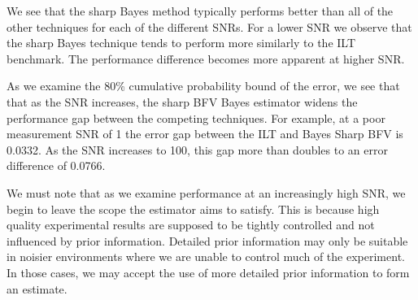 We see that the sharp Bayes method  typically performs better than all of the other techniques for each of the different SNRs. For a lower SNR we observe that the sharp Bayes technique tends to perform more similarly to the ILT benchmark. The performance difference becomes more apparent at higher SNR.

As we examine the 80\% cumulative probability bound of the error, we see that that as the SNR increases, the sharp BFV Bayes estimator widens the performance gap between the competing techniques. For example, at a poor measurement SNR of 1 the error gap between the ILT and Bayes Sharp BFV is 0.0332. As the SNR increases to 100, this gap more than doubles to an error difference of 0.0766. 

We must note that as we examine performance at an increasingly high SNR, we begin to leave the scope the estimator aims to satisfy. This is because high quality experimental results are supposed to be tightly controlled and not influenced by prior information. Detailed prior information may only be suitable in noisier environments where we are unable to control much of the experiment. In those cases, we may accept the use of more detailed prior information to form an estimate. 


